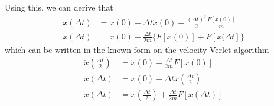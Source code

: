 \documentclass[11pt, oneside]{article}   	%
\begin{document}
Using this, we can derive that
	\begin{align}
	x(\Delta t) &= x(0) + \Delta t \dot{x}(0)+\frac{(\Delta t)^2}{2} \frac{F[x(0)]}{m} \\	
	\dot{x}(\Delta t) &= \dot{x}(0) + \frac{\Delta t}{2m} \{F[x(0)] + F[x(\Delta t] \}
	\end{align}	
which can be written in the known form on the velocity-Verlet algorithm
	\begin{align}
	\dot{x}(\frac{\Delta t}{2}) &= \dot{x}(0) + \frac{\Delta t}{2m} F[x(0)] \\
	x(\Delta t) &= x(0) + \Delta t \dot{x}(\frac{\Delta t}{2}) \\
	\dot{x}(\Delta t) &= \dot{x}(\frac{\Delta t}{2}) + \frac{\Delta t}{2m} F[x(\Delta t)]
	\end{align}
\end{document}

